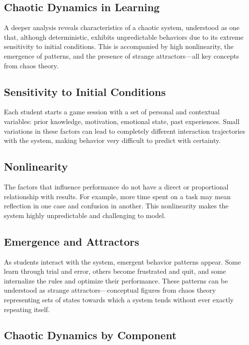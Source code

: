 \documentclass{article}
\begin{document}
\subsection*{Chaotic Dynamics in Learning}

A deeper analysis reveals characteristics of a chaotic system, understood 
as one that, although deterministic, exhibits unpredictable behaviors due 
to its extreme sensitivity to initial conditions. This is accompanied by 
high nonlinearity, the emergence of patterns, and the presence of strange 
attractors—all key concepts from chaos theory.

\subsection*{Sensitivity to Initial Conditions}

Each student starts a game session with a set of personal and contextual 
variables: prior knowledge, motivation, emotional state, past experiences. 
Small variations in these factors can lead to completely different 
interaction trajectories with the system, making behavior very difficult 
to predict with certainty.

\subsection*{Nonlinearity}

The factors that influence performance do not have a direct or 
proportional relationship with results. For example, more time spent on a 
task may mean reflection in one case and confusion in another. This 
nonlinearity makes the system highly unpredictable and challenging to 
model.

\subsection*{Emergence and Attractors}

As students interact with the system, emergent behavior patterns appear.
Some learn through trial and error, others become frustrated and quit, and 
some internalize the rules and optimize their performance. These patterns 
can be understood as strange attractors—conceptual figures from chaos 
theory representing sets of states towards which a system tends without 
ever exactly repeating itself.

\subsection*{Chaotic Dynamics by Component}
\end{document}
